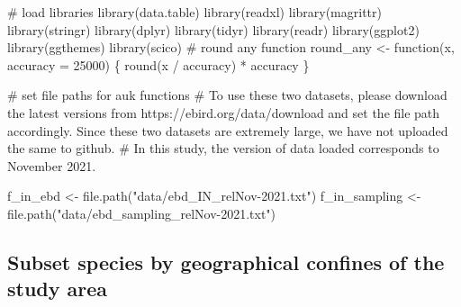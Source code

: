 \documentclass[
]{article}
\newenvironment{Shaded}{}{}
\newcommand{\CommentTok}[1]{\textcolor[rgb]{0.00,0.50,0.00}{#1}}
\newcommand{\ControlFlowTok}[1]{\textcolor[rgb]{0.00,0.00,1.00}{#1}}
\newcommand{\DataTypeTok}[1]{#1}
\newcommand{\DecValTok}[1]{#1}
\newcommand{\KeywordTok}[1]{\textcolor[rgb]{0.00,0.00,1.00}{#1}}
\newcommand{\NormalTok}[1]{#1}
\newcommand{\OperatorTok}[1]{#1}
\newcommand{\StringTok}[1]{\textcolor[rgb]{0.00,0.50,0.50}{#1}}
\begin{document}
\begin{Shaded}
\begin{Highlighting}[]
\CommentTok{# load libraries}
\KeywordTok{library}\NormalTok{(data.table)}
\KeywordTok{library}\NormalTok{(readxl)}
\KeywordTok{library}\NormalTok{(magrittr)}
\KeywordTok{library}\NormalTok{(stringr)}
\KeywordTok{library}\NormalTok{(dplyr)}
\KeywordTok{library}\NormalTok{(tidyr)}
\KeywordTok{library}\NormalTok{(readr)}
\KeywordTok{library}\NormalTok{(ggplot2)}
\KeywordTok{library}\NormalTok{(ggthemes)}
\KeywordTok{library}\NormalTok{(scico)}
\CommentTok{# round any function}
\NormalTok{round_any <-}\StringTok{ }\ControlFlowTok{function}\NormalTok{(x, }\DataTypeTok{accuracy =} \DecValTok{25000}\NormalTok{) \{}
  \KeywordTok{round}\NormalTok{(x }\OperatorTok{/}\StringTok{ }\NormalTok{accuracy) }\OperatorTok{*}\StringTok{ }\NormalTok{accuracy}
\NormalTok{\}}

\CommentTok{# set file paths for auk functions}
\CommentTok{# To use these two datasets, please download the latest versions from https://ebird.org/data/download and set the file path accordingly. Since these two datasets are extremely large, we have not uploaded the same to github.}
\CommentTok{# In this study, the version of data loaded corresponds to November 2021.}

\NormalTok{f_in_ebd <-}\StringTok{ }\KeywordTok{file.path}\NormalTok{(}\StringTok{"data/ebd_IN_relNov-2021.txt"}\NormalTok{)}
\NormalTok{f_in_sampling <-}\StringTok{ }\KeywordTok{file.path}\NormalTok{(}\StringTok{"data/ebd_sampling_relNov-2021.txt"}\NormalTok{)}
\end{Highlighting}
\end{Shaded}

\hypertarget{subset-species-by-geographical-confines-of-the-study-area}{%
\subsection{Subset species by geographical confines of the study area}\label{subset-species-by-geographical-confines-of-the-study-area}}
\end{document}
